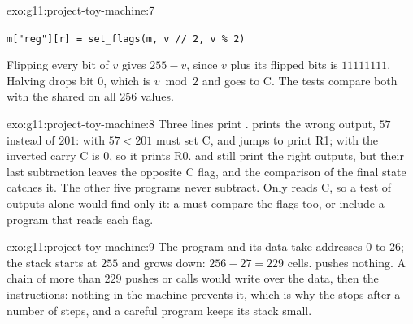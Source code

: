 \begin{solution}{exo:g11:project-toy-machine:7}
\smallskip\noindent\hspace*{2em}

\noindent\hspace*{4em}

\smallskip\noindent\hspace*{2em}

\noindent\hspace*{4em}

\noindent\hspace*{4em}\texttt{m["reg"][r] = set\_flags(m, v // 2, v \% 2)}

\smallskip\noindent Flipping every bit of $v$ gives $255 - v$, since $v$ plus its flipped bits is $11111111$. Halving
drops bit $0$, which is $v \bmod 2$ and goes to C. The tests compare both with the shared  on all $256$
values.
\end{solution}

\begin{solution}{exo:g11:project-toy-machine:8}
Three lines print .  prints the wrong output, $57$ instead of $201$: 
with $57 < 201$ must set C, and  jumps to print R1; with the inverted carry C is $0$, so it prints R0.
 and  still print the right outputs, but their last subtraction leaves the
opposite C flag, and the comparison of the final state catches it. The other five programs never subtract. Only  reads C, so a test of outputs alone would find only it: a
 must compare the flags too, or include a program that reads each flag.
\end{solution}

\begin{solution}{exo:g11:project-toy-machine:9}
The program and its data take addresses $0$ to $26$; the stack starts at $255$ and grows down: $256 - 27 = 229$
cells.  pushes nothing. A chain of more than $229$ pushes or calls would write over the data,
then the instructions: nothing in the machine prevents it, which is why the  stops after a number of steps,
and a careful program keeps its stack small.
\end{solution}

